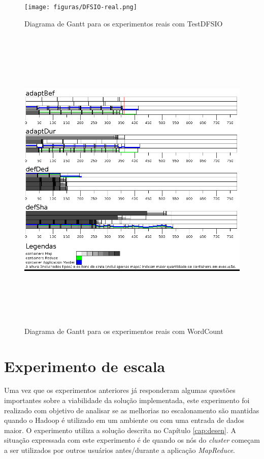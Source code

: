 \begin{figure}[!ht]
	\centering
	\texttt{[image: figuras/DFSIO-real.png]}
	\caption{Diagrama de Gantt para os experimentos reais com TestDFSIO}
	\label{fig:exp2IO}
\end{figure}

\begin{figure}[!ht]
	\centering
	\includegraphics[height=15cm]{figuras/WC-real.png}
	\caption{Diagrama de Gantt para os experimentos reais com WordCount}
	\label{fig:exp2WC}
\end{figure}


\section{Experimento de escala}
Uma vez que os experimentos anteriores já responderam algumas questões importantes sobre a viabilidade da solução implementada, este experimento foi realizado com objetivo de analisar se as melhorias no escalonamento são mantidas quando o Hadoop é utilizado em um ambiente ou com uma entrada de dados maior. O experimento utiliza a solução descrita no Capítulo \ref{cap:desen}. A situação expressada com este experimento é de quando os nós do \textit{cluster} começam a ser utilizados por outros usuários antes/durante a aplicação \textit{MapReduce}.

